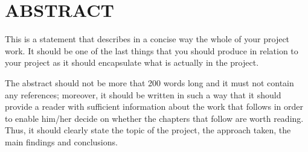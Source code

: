 \chapter*{ABSTRACT}
This is a statement that describes in a concise way the whole of your project work. It should be
one of the last things that you should produce in relation to your project as it should encapsulate
what is actually in the project.

The abstract should not be more that 200 words long and it must not contain any references;
moreover, it should be written in such a way that it should provide a reader with sufficient
information about the work that follows in order to enable him/her decide on whether the
chapters that follow are worth reading. Thus, it should clearly state the topic of the project, the
approach taken, the main findings and conclusions.
